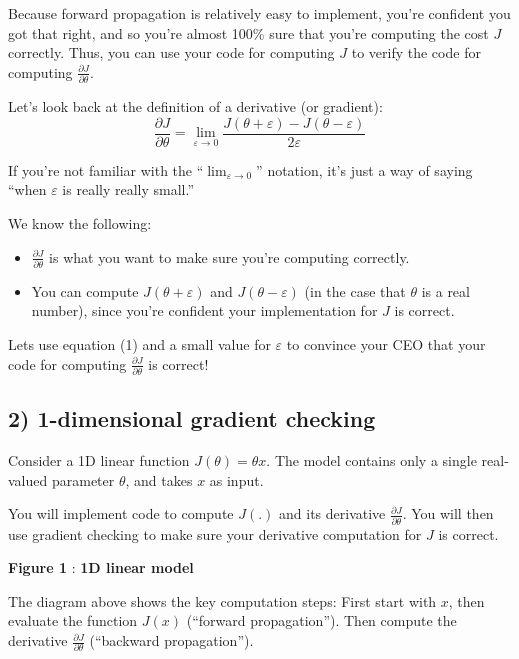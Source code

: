 \documentclass[11pt]{article}
\begin{document}
Because forward propagation is relatively easy to implement, you're
confident you got that right, and so you're almost 100\% sure that
you're computing the cost $J$ correctly. Thus, you can use your code for
computing $J$ to verify the code for computing
$\frac{\partial J}{\partial \theta}$.

Let's look back at the definition of a derivative (or gradient):
\[ \frac{\partial J}{\partial \theta} = \lim_{\varepsilon \to 0} \frac{J(\theta + \varepsilon) - J(\theta - \varepsilon)}{2 \varepsilon} \tag{1}\]

If you're not familiar with the
``$\displaystyle \lim_{\varepsilon \to 0}$'' notation, it's just a way
of saying ``when $\varepsilon$ is really really small.''

We know the following:

\begin{itemize}
\itemsep1pt\parskip0pt
\item
  $\frac{\partial J}{\partial \theta}$ is what you want to make sure
  you're computing correctly.
\item
  You can compute $J(\theta + \varepsilon)$ and
  $J(\theta - \varepsilon)$ (in the case that $\theta$ is a real
  number), since you're confident your implementation for $J$ is
  correct.
\end{itemize}

Lets use equation (1) and a small value for $\varepsilon$ to convince
your CEO that your code for computing
$\frac{\partial J}{\partial \theta}$ is correct!

    \subsection{2) 1-dimensional gradient
checking}\label{dimensional-gradient-checking}

Consider a 1D linear function $J(\theta) = \theta x$. The model contains
only a single real-valued parameter $\theta$, and takes $x$ as input.

You will implement code to compute $J(.)$ and its derivative
$\frac{\partial J}{\partial \theta}$. You will then use gradient
checking to make sure your derivative computation for $J$ is correct.

 \textbf{Figure 1} : \textbf{1D linear model}

The diagram above shows the key computation steps: First start with $x$,
then evaluate the function $J(x)$ (``forward propagation''). Then
compute the derivative $\frac{\partial J}{\partial \theta}$ (``backward
propagation'').
\end{document}
